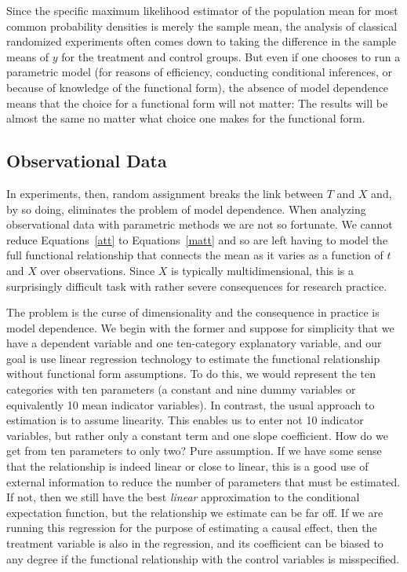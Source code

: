 \documentclass[11pt,titlepage]{article}
\begin{document}
Since the specific maximum likelihood estimator of the population mean
for most common probability densities is merely the sample mean, the
analysis of classical randomized experiments often comes down to
taking the difference in the sample means of $y$ for the treatment and
control groups.  But even if one chooses to run a parametric model
(for reasons of efficiency, conducting conditional inferences, or
because of knowledge of the functional form), the absence of model
dependence means that the choice for a functional form will not
matter: The results will be almost the same no matter what choice one
makes for the functional form.

\subsection{Observational Data} \label{s:paraobs}

In experiments, then, random assignment breaks the link between $T$
and $X$ and, by so doing, eliminates the problem of model dependence.
When analyzing observational data with parametric methods we are not
so fortunate.  We cannot reduce Equations~\ref{att} to
Equations~\ref{matt} and so are left having to model the full
functional relationship that connects the mean as it varies as a
function of $t$ and $X$ over observations.  Since $X$ is typically
multidimensional, this is a surprisingly difficult task with rather
severe consequences for research practice.

The problem is the curse of dimensionality and the consequence in
practice is model dependence.  We begin with the former and suppose
for simplicity that we have a dependent variable and one ten-category
explanatory variable, and our goal is use linear regression technology
to estimate the functional relationship without functional form
assumptions.  To do this, we would represent the ten categories with
ten parameters (a constant and nine dummy variables or equivalently 10
mean indicator variables).  In contrast, the usual approach to
estimation is to assume linearity.  This enables us to enter not 10
indicator variables, but rather only a constant term and one slope
coefficient.  How do we get from ten parameters to only two?  Pure
assumption.  If we have some sense that the relationship is indeed
linear or close to linear, this is a good use of external information
to reduce the number of parameters that must be estimated.  If not,
then we still have the best {\it linear} approximation to the
conditional expectation function, but the relationship we estimate can
be far off.  If we are running this regression for the purpose of
estimating a causal effect, then the treatment variable is also in the
regression, and its coefficient can be biased to any degree if the
functional relationship with the control variables is misspecified.
\end{document}
